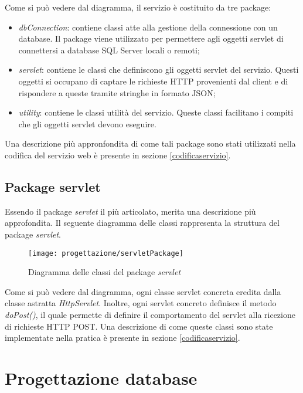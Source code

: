 Come si può vedere dal diagramma, il servizio è costituito da tre package:
\begin{itemize}
	\item \textit{dbConnection}: contiene classi atte alla gestione della connessione con un database. Il package viene utilizzato per permettere agli oggetti servlet di connettersi a database SQL Server locali o remoti;
	\item \textit{servlet}: contiene le classi che definiscono gli oggetti servlet del servizio. Questi oggetti si occupano di captare le richieste HTTP provenienti dal client e di rispondere a queste tramite stringhe in formato JSON;
	\item \textit{utility}: contiene le classi utilità del servizio. Queste classi facilitano i compiti che gli oggetti servlet devono eseguire.
\end{itemize}
Una descrizione più appronfondita di come tali package sono stati utilizzati nella codifica del servizio web è presente in sezione \ref{codificaservizio}.

\subsection{Package servlet}

Essendo il package \textit{servlet} il più articolato, merita una descrizione più approfondita. Il seguente diagramma delle classi rappresenta la struttura del package \textit{servlet}.

\begin{figure}[!h] 
    \centering 
    \texttt{[image: progettazione/servletPackage]} 
    \caption{Diagramma delle classi del package \textit{servlet}}
\end{figure}

Come si può vedere dal diagramma, ogni classe servlet concreta eredita dalla classe astratta \textit{HttpServlet}. Inoltre, ogni servlet concreto definisce il metodo \textit{doPost()}, il quale permette di definire il comportamento del servlet alla ricezione di richieste HTTP POST. Una descrizione di come queste classi sono state implementate nella pratica è presente in sezione \ref{codificaservizio}.

\section{Progettazione database} \label{progdb}

